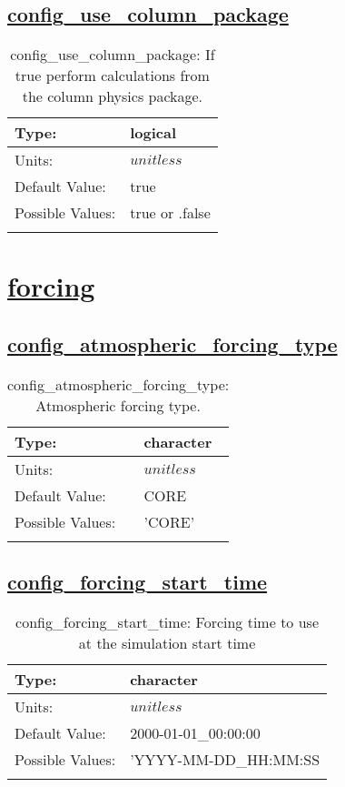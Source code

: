 \subsection[config\_use\_column\_package]{\hyperref[sec:nm_tab_use_sections]{config\_use\_column\_package}}
\label{subsec:nm_sec_config_use_column_package}
\begin{center}
\begin{longtable}{| p{2.0in} || p{4.0in} |}
    \hline
    Type: & logical \\
    \hline
    Units: & $unitless$ \\
    \hline
    Default Value: & true \\
    \hline
    Possible Values: & true or .false \\
    \hline
    \caption{config\_use\_column\_package: If true perform calculations from the column physics package.}
\end{longtable}
\end{center}
\section[forcing]{\hyperref[sec:nm_tab_forcing]{forcing}}
\label{sec:nm_sec_forcing}
\subsection[config\_atmospheric\_forcing\_type]{\hyperref[sec:nm_tab_forcing]{config\_atmospheric\_forcing\_type}}
\label{subsec:nm_sec_config_atmospheric_forcing_type}
\begin{center}
\begin{longtable}{| p{2.0in} || p{4.0in} |}
    \hline
    Type: & character \\
    \hline
    Units: & $unitless$ \\
    \hline
    Default Value: & CORE \\
    \hline
    Possible Values: & 'CORE' \\
    \hline
    \caption{config\_atmospheric\_forcing\_type: Atmospheric forcing type.}
\end{longtable}
\end{center}
\subsection[config\_forcing\_start\_time]{\hyperref[sec:nm_tab_forcing]{config\_forcing\_start\_time}}
\label{subsec:nm_sec_config_forcing_start_time}
\begin{center}
\begin{longtable}{| p{2.0in} || p{4.0in} |}
    \hline
    Type: & character \\
    \hline
    Units: & $unitless$ \\
    \hline
    Default Value: & 2000-01-01\_00:00:00 \\
    \hline
    Possible Values: & 'YYYY-MM-DD\_HH:MM:SS \\
    \hline
    \caption{config\_forcing\_start\_time: Forcing time to use at the simulation start time}
\end{longtable}
\end{center}
